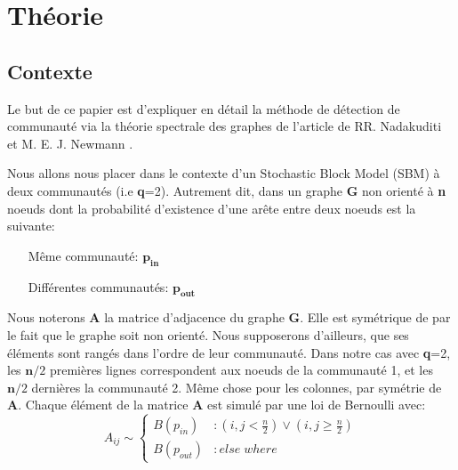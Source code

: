 \section{Théorie}
\subsection{Contexte}
Le but de ce papier est d'expliquer en détail la méthode de détection de communauté via la théorie spectrale des graphes de l'article de RR. Nadakuditi et M. E. J. Newmann .

Nous allons nous placer dans le contexte d'un Stochastic Block Model (SBM) à deux communautés (i.e \textbf{q}=2).
Autrement dit, dans un graphe \textbf{G} non orienté à \textbf{n} noeuds dont la probabilité d'existence d'une arête entre deux noeuds est la suivante:
\begin{itemize}
    \item[Même communauté:] $\mathbf{p_{in}}$  
    \item[Différentes communautés:] $\mathbf{p_{out}}$\\
\end{itemize}

Nous noterons \textbf{A} la matrice d'adjacence du graphe \textbf{G}.
Elle est symétrique de par le fait que le graphe soit non orienté.
Nous supposerons d'ailleurs, que ses éléments sont rangés dans l'ordre de leur communauté.
Dans notre cas avec \textbf{q}=2, les $\mathbf{n}/2$ premières lignes correspondent aux noeuds de la communauté 1, et les $\mathbf{n}/2$ dernières la communauté 2.
Même chose pour les colonnes, par symétrie de \textbf{A}.
Chaque élément de la matrice \textbf{A} est simulé par une loi de Bernoulli avec: 
\begin{equation} 
 A_{ij} \sim \left\{
  \begin{array}{lr}
    B(p_{in}) & : (i,j < \frac{n}{2}) \lor (i,j \ge \frac{n}{2}) \\
    B(p_{out}) & : else \; where
  \end{array}
\right.\nonumber
\end{equation}

